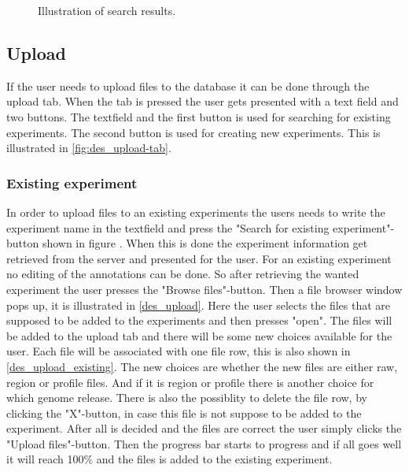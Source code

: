\begin{figure}[htb]
	\caption{Illustration of search results.}
	\label{fig:des_search-results}
\end{figure}
\FloatBarrier

\subsection{Upload}
If the user needs to upload files to the database it can be done through the upload tab. When the tab is pressed the user gets presented with a text field and two buttons. The textfield and the first button is used for searching for existing experiments. The second button is used for creating new experiments. This is illustrated in \ref{fig:des_upload-tab}.
\subsubsection{Existing experiment}
\label{sec:des_exists}
In order to upload files to an existing experiments the users needs to write the experiment name in the textfield and press the "Search for existing experiment"-button shown in figure . When this is done the experiment information get retrieved from the server and presented for the user. For an existing experiment no editing of the annotations can be done. So after retrieving the wanted experiment the user presses the "Browse files"-button. Then a file browser window pops up, it is illustrated in \ref{des_upload}. Here the user selects the files that are supposed to be added to the experiments and then presses "open". The files will be added to the upload tab and there will be some new choices available for the user. Each file  will be associated with one file row, this is also shown in \ref{des_upload_existing}. The new choices are whether the new files are either raw, region or profile files. And if it is region or profile there is another choice for which genome release. There is also the possiblity to delete the file row, by clicking the "X"-button, in case this file is not suppose to be added to the experiment. After all is decided and the files are correct the user simply clicks the "Upload files"-button. Then the progress bar starts to progress and if all goes well it will reach 100\% and the files is added to the existing experiment.
